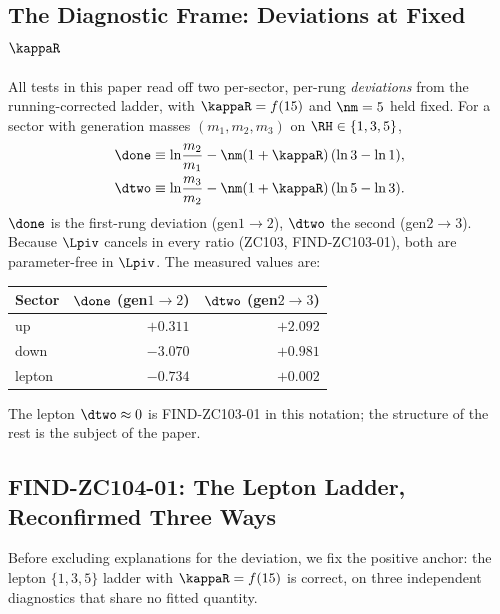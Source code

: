 \documentclass[12pt, a4paper]{article}
\begin{document}
\newpage

\subsection{The Diagnostic Frame: Deviations at Fixed $\kappaR$}
\label{sec:frame-zc104}

All tests in this paper read off two per-sector, per-rung \emph{deviations} from
the running-corrected ladder, with $\kappaR=f(15)$ and $\nm=5$ held fixed. For a
sector with generation masses $(m_1,m_2,m_3)$ on $\RH\in\{1,3,5\}$,
\begin{align}
  \done &\equiv \ln\!\frac{m_2}{m_1}
         - \nm(1+\kappaR)\,(\ln 3-\ln 1), \label{eq:d1-zc104}\\
  \dtwo &\equiv \ln\!\frac{m_3}{m_2}
         - \nm(1+\kappaR)\,(\ln 5-\ln 3). \label{eq:d2-zc104}
\end{align}
$\done$ is the first-rung deviation (gen$1{\to}2$), $\dtwo$ the second
(gen$2{\to}3$). Because $\Lpiv$ cancels in every ratio (ZC103, FIND-ZC103-01),
both are parameter-free in $\Lpiv$. The measured values are:

\begin{center}
{\small\renewcommand{\arraystretch}{1.25}
\begin{tabular}{@{}lrr@{}}
\toprule
Sector & $\done$ (gen$1{\to}2$) & $\dtwo$ (gen$2{\to}3$) \\
\midrule
up     & $+0.311$ & $+2.092$ \\
down   & $-3.070$ & $+0.981$ \\
lepton & $-0.734$ & $+0.002$ \\
\bottomrule
\end{tabular}}
\end{center}

The lepton $\dtwo\approx0$ is FIND-ZC103-01 in this notation; the structure of
the rest is the subject of the paper.

\subsection{FIND-ZC104-01: The Lepton Ladder, Reconfirmed Three Ways}
\label{sec:positive-zc104}

Before excluding explanations for the deviation, we fix the positive anchor: the
lepton $\{1,3,5\}$ ladder with $\kappaR=f(15)$ is correct, on three independent
diagnostics that share no fitted quantity.
\end{document}
